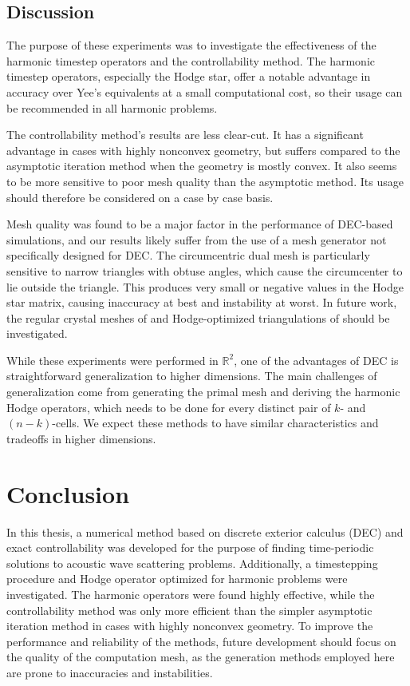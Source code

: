 \documentclass[utf8,english]{gradu3}
\begin{document}
\section{Discussion}

The purpose of these experiments was to investigate
the effectiveness of the harmonic time\-step operators
and the controllability method.
The harmonic timestep operators, especially the Hodge star,
offer a notable advantage in accuracy
over Yee's equivalents at a small computational cost,
so their usage can be recommended in all harmonic problems.

The controllability method's results are less clear-cut.
It has a significant advantage in cases with highly nonconvex geometry,
but suffers compared to the asymptotic iteration method
when the geometry is mostly convex.
It also seems to be more sensitive to poor mesh quality
than the asymptotic method.
Its usage should therefore be considered on a case by case basis.

Mesh quality was found to be a major factor in the performance of DEC-based simulations,
and our results likely suffer from the use of a mesh generator
not specifically designed for DEC.
The circumcentric dual mesh is particularly sensitive to narrow triangles
with obtuse angles, which cause the circumcenter to lie outside the triangle.
This produces very small or negative values
in the Hodge star matrix, causing inaccuracy at best and instability at worst.
In future work, the regular crystal meshes of \textcite{rabina_numerical_2014}
and Hodge-optimized triangulations of \textcite{mullen_hot_2011} should be investigated.

While these experiments were performed in $\mathbb{R}^2$,
one of the advantages of DEC is straightforward generalization to higher dimensions.
The main challenges of generalization come from generating the primal mesh
and deriving the harmonic Hodge operators, which needs to be done
for every distinct pair of $k$- and $(n-k)$-cells.
We expect these methods to have similar characteristics and tradeoffs
in higher dimensions.


\chapter{Conclusion}

In this thesis, a numerical method based on discrete exterior calculus (DEC)
and exact controllability was developed
for the purpose of finding time-periodic solutions to acoustic wave scattering problems.
Additionally, a timestepping procedure
and Hodge operator optimized for harmonic problems were investigated.
The harmonic operators were found highly effective,
while the controllability method was only more efficient
than the simpler asymptotic iteration method
in cases with highly nonconvex geometry.
To improve the performance and reliability of the methods,
future development should focus on the quality of the computation mesh,
as the generation methods employed here
are prone to inaccuracies and instabilities.


\hfuzz=4pt
\printbibliography
\hfuzz=0pt
\end{document}
